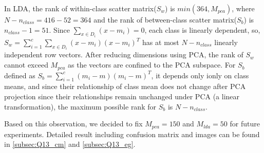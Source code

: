 In LDA, the rank of within-class scatter matrix($S_w$) is $min(364, M_{pca})$, where $N-n_{class}=416-52=364$ and the rank of between-class scatter matrix($S_b$) is $n_{class}-1=51$. Since $\sum_{x\in D_i} (x-m_i) = 0$, each class is linearly dependent, so, $S_w = \sum_{i=1}^c \sum_{x\in D_i} (x-m_i)(x-m_i)^T$ has at most $N-n_{class}$ linearly independent row vectors. After reducing dimensions using PCA, the rank of $S_w$ cannot exceed $M_{pca}$ as the vectors are confined to the PCA subspace. For $S_b$ defined as $S_b = \sum_{i=1}^c (m_i-m)(m_i-m)^T$, it depends only ionly on class means, and since their relationship of class mean does not change after PCA projection since their relationships remain unchanged under PCA (a linear transformation), the maximum possible rank for $S_b$ is $N - n_{class}$.

Based on this observation, we decided to fix $M_{pca}=150$ and $M_{lda}=50$ for future experiments. Detailed result including confusion matrix and images can be found in \cref{subsec:Q13_cm} and \cref{subsec:Q13_eg}.  %








